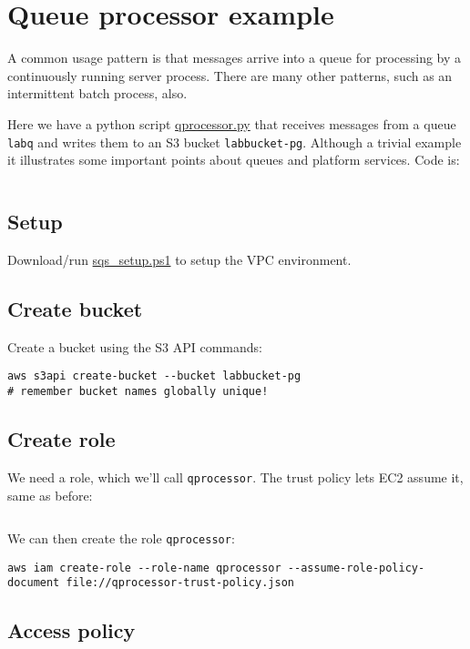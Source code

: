 \section{Queue processor example}


A common usage pattern is that messages arrive into a queue for processing by a continuously running server process.
There are many other patterns, such as an intermittent batch process, also.

Here we have a python script \url{qprocessor.py} that receives messages from a queue \texttt{labq} and writes them to an S3 bucket \texttt{labbucket-pg}.
Although a trivial example it illustrates some important points about queues and platform services.
Code is:

\inputminted{python}{qprocessor.py}

\subsection{Setup}

Download/run \url{sqs_setup.ps1} to setup the VPC environment.

\subsection{Create bucket}

Create a bucket using the S3 API commands:
\begin{verbatim}
aws s3api create-bucket --bucket labbucket-pg
# remember bucket names globally unique!
\end{verbatim}

\subsection{Create role}

We need a role, which we'll call \texttt{qprocessor}.
The trust policy lets EC2 assume it, same as before:

\inputminted{json}{qprocessor-trust-policy.json}

We can then create the role \texttt{qprocessor}:
\begin{verbatim}
aws iam create-role --role-name qprocessor --assume-role-policy-document file://qprocessor-trust-policy.json
\end{verbatim}

\subsection{Access policy}

